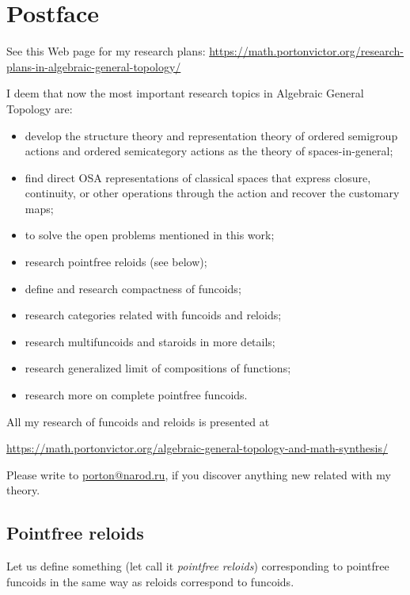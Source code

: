 
\chapter{Postface}

See this Web page for my research plans: \href{https://math.portonvictor.org/research-plans-in-algebraic-general-topology/}{https://math.portonvictor.org/research-plans-in-algebraic-general-topology/}

I deem that now the most important research topics in Algebraic General
Topology are:
\begin{itemize}
\item develop the structure theory and representation theory of ordered
semigroup actions and ordered semicategory actions as the theory of
spaces-in-general;
\item find direct OSA representations of classical spaces that express
closure, continuity, or other operations through the action and recover
the customary maps;
\item to solve the open problems mentioned in this work;
\item research pointfree reloids (see below);
\item define and research compactness of funcoids;
\item research categories related with funcoids and reloids;
\item research multifuncoids and staroids in more details;
\item research generalized limit of compositions of functions;
\item research more on complete pointfree funcoids.
\end{itemize}
All my research of funcoids and reloids is presented at

\href{https://math.portonvictor.org/algebraic-general-topology-and-math-synthesis/}{https://math.portonvictor.org/algebraic-general-topology-and-math-synthesis/}

Please write to \href{mailto:porton@narod.ru}{porton@narod.ru}, if
you discover anything new related with my theory.


\section{Pointfree reloids}

Let us define something (let call it \emph{pointfree reloids}) corresponding
to pointfree funcoids in the same way as reloids correspond to funcoids.

